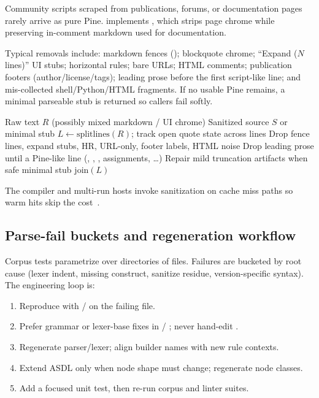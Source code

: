 \documentclass[11pt,a4paper]{article}
\begin{document}
Community scripts scraped from publications, forums, or documentation pages
rarely arrive as pure Pine.  implements
, which strips page chrome while preserving
in-comment markdown used for  documentation.

Typical removals include: markdown fences (); blockquote chrome;
``Expand (\(N\) lines)'' UI stubs; horizontal rules; bare URLs; HTML comments;
publication footers (author/license/tags); leading prose before the first
script-like line; and mis-collected shell/Python/HTML fragments.
If no usable Pine remains, a minimal parseable stub is returned so callers fail
softly.

\begin{algorithm}[t]
\caption{SanitizeCorpus}
\label{alg:sanitize}
\begin{algorithmic}[1]
\Require Raw text \(R\) (possibly mixed markdown / UI chrome)
\Ensure Sanitized source \(S\) or minimal stub
\State \(L \gets \mathrm{splitlines}(R)\); track open quote state across lines
\State Drop fence lines, expand stubs, HR, URL-only, footer labels, HTML noise
\State Drop leading prose until a Pine-like line (, 
       , , assignments, \ldots)
\State Repair mild truncation artifacts when safe
  \State \Return minimal stub 
\EndIf
\State \Return \(\mathrm{join}(L)\)
\end{algorithmic}
\end{algorithm}

The compiler and multi-run hosts invoke sanitization on cache miss paths so warm
hits skip the cost~\citep{pynescript2026}.

\subsection{Parse-fail buckets and regeneration workflow}
\label{sec:regen}

Corpus tests parametrize over directories of  files. Failures are
bucketed by root cause (lexer indent, missing construct, sanitize residue,
version-specific syntax). The engineering loop is:

\begin{enumerate}[leftmargin=*]
  \item Reproduce with / on the failing file.
  \item Prefer grammar or lexer-base fixes in  /
    ; never hand-edit .
  \item Regenerate parser/lexer; align builder  names with new
    rule contexts.
  \item Extend ASDL only when node shape must change; regenerate node classes.
  \item Add a focused unit test, then re-run corpus and linter suites.
\end{enumerate}
\end{document}
